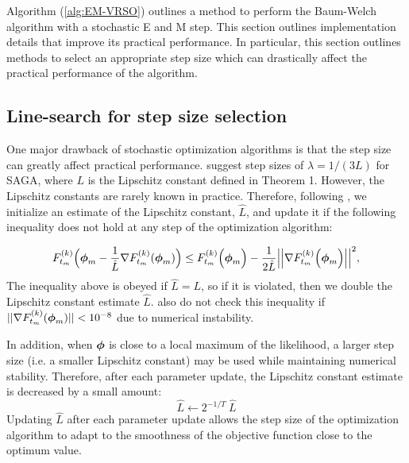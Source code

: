 
Algorithm (\ref{alg:EM-VRSO}) outlines a method to perform the Baum-Welch algorithm with a stochastic E and M step. This section outlines implementation details that improve its practical performance. In particular, this section outlines methods to select an appropriate step size which can drastically affect the practical performance of the algorithm.

\subsection{Line-search for step size selection}
\label{subsec:est_L}

One major drawback of stochastic optimization algorithms is that the step size can greatly affect practical performance. %
\citet{Defazio:2014} suggest step sizes of $\lambda = 1/(3L)$ for SAGA, where $L$ is the Lipschitz constant defined in Theorem 1. However, the Lipschitz constants are rarely known in practice. Therefore, following \citet{Schmidt:2017}, we initialize an estimate of the Lipschitz constant, $\hat L$, and update it if the following inequality does not hold at any step of the optimization algorithm:

\begin{gather}
    F^{(k)}_{t_{m}}\Big(\boldsymbol{\phi}_{m} - \frac{1}{\hat L}\nabla F^{(k)}_{t_{m}}(\boldsymbol{\phi}_{m})\Big) \leq F^{(k)}_{t_{m}}\Big(\boldsymbol{\phi}_{m}\Big) - \frac{1}{2 \hat L} \Big| \Big| \nabla F^{(k)}_{t_{m}}\Big(\boldsymbol{\phi}_{m}\Big) \Big| \Big| ^2,
    \label{ineq:F}
\end{gather}
%
The inequality above is obeyed if $\hat L = L$, so if it is violated, then we double the Lipschitz constant estimate $\hat L$. \citet{Schmidt:2017} also do not check this inequality if $||\nabla F^{(k)}_{t_{m}}(\boldsymbol{\phi}_{m})|| < 10^{-8}$ due to numerical instability. 

In addition, when $\boldsymbol{\phi}$ is close to a local maximum of the likelihood, a larger step size (i.e. a smaller Lipschitz constant) may be used while maintaining numerical stability. Therefore, after each parameter update, the Lipschitz constant estimate is decreased by a small amount:
%
\begin{equation}
    \hat L \leftarrow 2^{-1/T} ~ \hat L
\end{equation}
%
Updating $\hat L$ after each parameter update allows the step size of the optimization algorithm to adapt to the smoothness of the objective function close to the optimum value.

